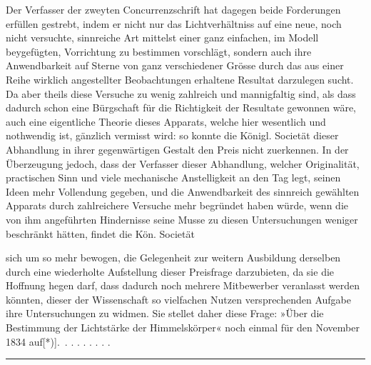 Der Verfasser der zweyten Concurrenzschrift hat dagegen beide Forderungen erfüllen gestrebt, indem er nicht nur das Lichtverhältniss auf eine neue, noch nicht versuchte, sinnreiche Art mittelst einer ganz einfachen, im Modell beygefügten, Vorrichtung zu bestimmen vorschlägt, sondern auch ihre Anwendbarkeit auf Sterne von ganz verschiedener Grösse durch das aus einer Reihe wirklich angestellter Beobachtungen erhaltene Resultat darzulegen sucht. Da aber theils diese Versuche zu wenig zahlreich und mannigfaltig sind, als dass dadurch schon eine Bürgschaft für die Richtigkeit der Resultate gewonnen wäre, auch eine eigentliche Theorie dieses Apparats, welche hier wesentlich und nothwendig ist, gänzlich vermisst wird: so konnte die Königl. Societät dieser Abhandlung in ihrer gegenwärtigen Gestalt den Preis nicht zuerkennen. In der Überzeugung jedoch, dass der Verfasser dieser Abhandlung, welcher Originalität, practischen Sinn und viele mechanische Anstelligkeit an den Tag legt, seinen Ideen mehr Vollendung gegeben, und die Anwendbarkeit des sinnreich gewählten Apparats durch zahlreichere Versuche mehr begründet haben würde, wenn die von ihm angeführten Hindernisse seine Musse zu diesen Untersuchungen weniger beschränkt hätten, findet die Kön. Societät
\par{}
\clearpage{}
\noindent sich um so mehr bewogen, die Gelegenheit zur weitern Ausbildung derselben durch eine wiederholte Aufstellung dieser Preisfrage darzubieten, da sie die Hoffnung hegen darf, dass dadurch noch mehrere Mitbewerber veranlasst werden könnten, dieser der Wissenschaft so vielfachen Nutzen versprechenden Aufgabe ihre Untersuchungen zu widmen. Sie stellet daher diese Frage: »Über die Bestimmung der Lichtstärke der Himmelskörper« noch einmal für den November 1834 auf[*)].\begingroup\renewcommand{\thefootnote}{}\endgroup\ . . . . . . . .
\par\vspace{2\baselineskip}\begin{center}\rule{.24\linewidth}{.4pt}\end{center}
\clearpage\endgroup
